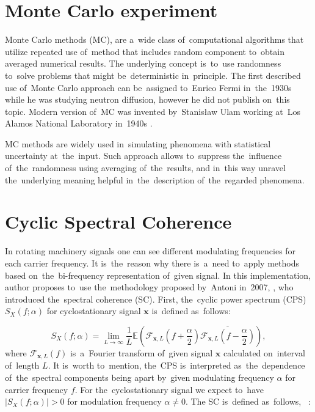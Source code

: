 \section{Monte Carlo experiment}\label{app_monte}

Monte Carlo methods (MC), are a~wide class of~computational algorithms that utilize repeated use of~method that includes random component to~obtain averaged numerical results. The underlying concept is~to~use randomness to~solve problems that might be~deterministic in~principle. The first described use of~Monte Carlo approach can be~assigned to~Enrico Fermi in~the~1930s while he was studying neutron diffusion, however he did not publish on~this topic. Modern version of~MC was invented by~Stanisław Ulam working at~Los Alamos National Laboratory in~1940s \cite{metropolis1949monte}. 

MC methods are widely used in~simulating phenomena with statistical uncertainty at~the~input. Such approach allows to~suppress the~influence of~the~randomness using averaging of~the~results, and in~this way unravel the~underlying meaning helpful in~the~description of~the~regarded phenomena.


\section{Cyclic Spectral Coherence}\label{app_csc}
In rotating machinery signals one can see different modulating frequencies for each carrier frequency. It is~the~reason why there is~a~need to~apply methods based on~the~bi-frequency representation of~given signal. In this implementation, author proposes to~use the~methodology proposed by~Antoni in~2007, \cite{antoni2007cyclic}, who introduced the~spectral coherence (SC). First, the~cyclic power spectrum (CPS) $S_X(f;\alpha)$ for cyclostationary signal $\mathbf{x}$ is~defined as~follows:

\begin{equation}
\label{eq:CPS}
S_X(f;\alpha)=\lim_{L\to \infty} \frac{1}{L}\mathbb{E} \left(\mathcal{F}_{\mathbf{x},L} \left(f+\frac{\alpha}{2}\right)\overline{\mathcal{F}_{\mathbf{x},L}\left(f-\frac{\alpha}{2}\right)}\right),
\end{equation}
where $\mathcal{F}_{\mathbf{x},L}(f)$ is~a~Fourier transform of~given signal $\mathbf{x}$ calculated on~interval of~length $L$. It is~worth to~mention, the~CPS is~interpreted as~the~dependence of~the~spectral components being apart by~given modulating frequency $\alpha$ for carrier frequency $f$. For the~cyclostationary signal we expect to~have $\left|S_X(f;\alpha)\right|>0$ for modulation frequency $\alpha\neq 0$. The SC is~defined as~follows, ~\cite{antoni2007cyclic}:

